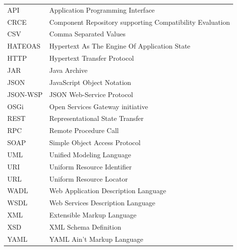 \documentclass[czech,DP]{thesiskiv}
\newcommand\nomenclature[2]{#1 & #2 \\}
\begin{document}
\begin{longtable}{@{}p{3cm}@{}p{\dimexpr\textwidth-1cm\relax}@{}}
	\nomenclature{API}{Application Programming Interface}
	\nomenclature{CRCE}{Component Repository supporting Compatibility Evaluation}
	\nomenclature{CSV}{Comma Separated Values}
	\nomenclature{HATEOAS}{Hypertext As The Engine Of Application State}
	\nomenclature{HTTP}{Hypertext Transfer Protocol}
	\nomenclature{JAR}{Java Archive}
	\nomenclature{JSON}{JavaScript Object Notation}
	\nomenclature{JSON-WSP}{JSON Web-Service Protocol}
	\nomenclature{OSGi}{Open Services Gateway initiative}
	\nomenclature{REST}{Representational State Transfer}
	\nomenclature{RPC}{Remote Procedure Call}
	\nomenclature{SOAP}{Simple Object Access Protocol}
	\nomenclature{UML}{Unified Modeling Language}
	\nomenclature{URI}{Uniform Resource Identifier}
	\nomenclature{URL}{Uniform Resource Locator}
	\nomenclature{WADL}{Web Application Description Language}
	\nomenclature{WSDL}{Web Services Description Language}
	\nomenclature{XML}{Extensible Markup Language}
	\nomenclature{XSD}{XML Schema Definition}
	\nomenclature{YAML}{YAML Ain't Markup Language}
\end{longtable}

\appendix
\end{document}
